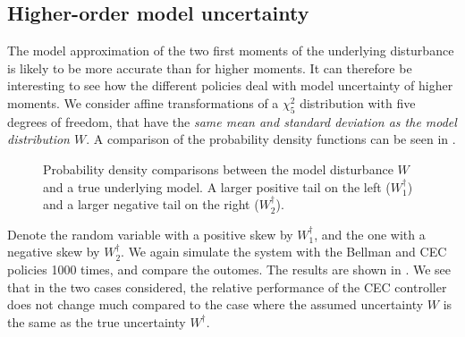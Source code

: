 \documentclass[main.tex]{subfiles}
\begin{document}
\subsection{Higher-order model uncertainty}
The model approximation of the two first moments of the underlying
disturbance is likely to be more accurate than for higher moments.
It can therefore be interesting to see how the different
policies deal with model uncertainty of higher moments.
We consider affine transformations of a $\chi^2_5$ distribution with five degrees of
freedom, that have the \emph{same mean and standard deviation as the model
  distribution $W$}. A comparison of the probability density
functions can be seen in .
\begin{figure}[htbp]
  \centering
  \begin{subfigure}[b]{0.5\textwidth}
  \end{subfigure}%
  \begin{subfigure}[b]{0.5\textwidth}
  \end{subfigure}
  \caption{Probability density comparisons between
    the model disturbance $W$ and a true underlying
    model. A larger positive tail on the left ($W_1^\dagger$) and
    a larger negative tail on the right ($W_2^\dagger$).
  }\label{fig:chisq_transformed}
\end{figure}
Denote the random variable with a positive skew by $W_1^\dagger$, and
the one with a negative skew by $W_2^\dagger$.
We again simulate the system with the Bellman and CEC policies 1000
times, and compare the outomes. The results are shown in
. We see that in the two cases considered,
the relative performance of the CEC controller does not change much
compared to the case where the assumed uncertainty $W$ is the same as
the true uncertainty $W^\dagger$.
\end{document}
